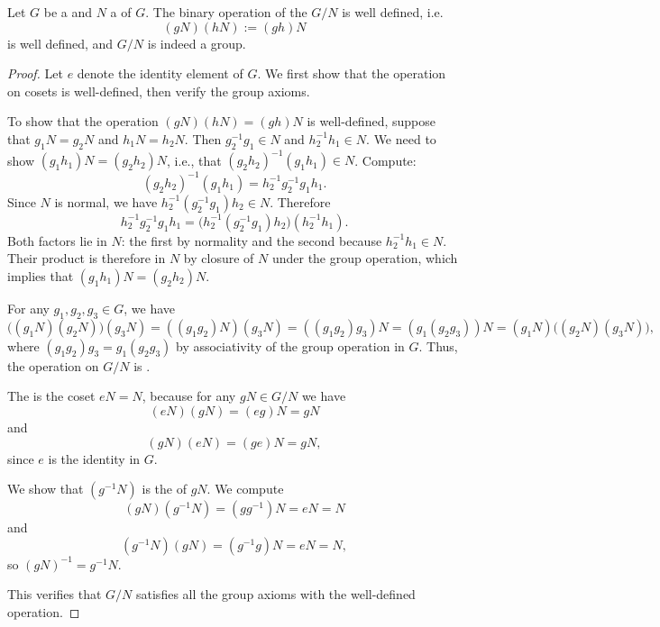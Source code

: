 \begin{proposition} \label{proposition:quotient_group_of_a_group_by_a_normal_subgroup_has_well_deinfed_operation}
    Let $G$ be a  and $N$ a  of $G$.
    The binary operation of the  $G/N$ is well defined, i.e.
    $$(g N) (hN) := (gh)N$$
    is well defined, and $G/N$ is indeed a group.
\end{proposition}
\begin{proof}
    Let $e$ denote the identity element of $G$. We first show that the operation on cosets is well-defined, then verify the group axioms.

    To show that the operation $(gN)(hN) = (gh)N$ is well-defined, suppose that $g_1 N = g_2 N$ and $h_1 N = h_2 N$. Then $g_2^{-1} g_1 \in N$ and $h_2^{-1} h_1 \in N$. We need to show $(g_1 h_1)N = (g_2 h_2)N$, i.e., that $(g_2 h_2)^{-1} (g_1 h_1) \in N$. Compute:
    $$(g_2 h_2)^{-1} (g_1 h_1) = h_2^{-1} g_2^{-1} g_1 h_1.$$
    Since $N$ is normal, we have $h_2^{-1} (g_2^{-1} g_1) h_2 \in N$. Therefore
    $$h_2^{-1} g_2^{-1} g_1 h_1 = \bigl(h_2^{-1} (g_2^{-1} g_1) h_2\bigr) (h_2^{-1} h_1).$$
    Both factors lie in $N$: the first by normality and the second because $h_2^{-1} h_1 \in N$. Their product is therefore in $N$ by closure of $N$ under the group operation, which implies that $(g_1 h_1)N = (g_2 h_2)N$.

    For any $g_1, g_2, g_3 \in G$, we have
    $$\bigl((g_1 N)(g_2 N)\bigr)(g_3 N) = ((g_1 g_2)N)(g_3 N) = ((g_1 g_2)g_3)N = (g_1(g_2 g_3))N = (g_1 N)\bigl((g_2 N)(g_3 N)\bigr),$$
    where $(g_1 g_2)g_3 = g_1(g_2 g_3)$ by associativity of the group operation in $G$. Thus, the operation on $G/N$ is .

    The  is the coset $eN = N$, because for any $gN \in G/N$ we have
    $$(eN)(gN) = (eg)N = gN$$
    and
    $$(gN)(eN) = (ge)N = gN,$$
    since $e$ is the identity in $G$.

    We show that $(g^{-1} N)$ is the  of $gN$. We compute
    $$(gN)(g^{-1} N) = (gg^{-1})N = eN = N$$
    and
    $$(g^{-1} N)(gN) = (g^{-1} g)N = eN = N,$$
    so $(gN)^{-1} = g^{-1} N$.

    This verifies that $G/N$ satisfies all the group axioms with the well-defined operation.
\end{proof}
